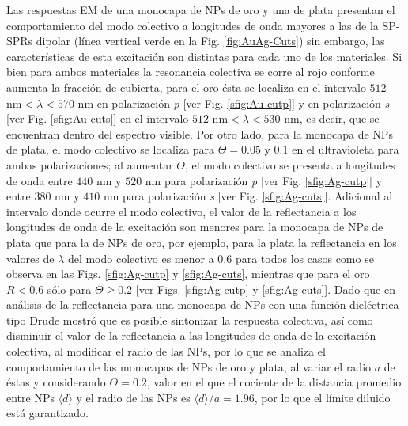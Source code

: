 Las respuestas EM de una monocapa de NPs  de oro y una de plata presentan el comportamiento del modo colectivo a longitudes de onda mayores a las de la SP-SPRs dipolar (línea vertical verde en la Fig. \ref{fig:AuAg-Cuts}) sin embargo, las características de esta excitación son distintas para cada uno de los materiales. Si bien para ambos materiales la resonancia colectiva se corre al rojo conforme aumenta la fracción de cubierta, para el oro ésta se localiza en el intervalo $512$ nm$<\lambda<570$ nm en polarización \emph{p} [ver Fig. \ref{sfig:Au-cutp}] y  en polarización \emph{s} [ver Fig. \ref{sfig:Au-cuts}] en el intervalo  $512$ nm$<\lambda<530$ nm, es decir, que se encuentran dentro del espectro visible. Por otro lado, para la monocapa de NPs de plata, el modo colectivo se localiza para $\Theta = 0.05$ y $0.1$ en el ultravioleta para ambas polarizaciones; al aumentar $\Theta$, el modo colectivo se presenta a longitudes de onda entre $440$ nm y $520$ nm para polarización \emph{p} [ver Fig. \ref{sfig:Ag-cutp}] y entre $380$ nm y $410$ nm para polarización \emph{s} [ver Fig. \ref{sfig:Ag-cuts}]. Adicional al intervalo donde ocurre el modo colectivo, el valor de la reflectancia a los longitudes de onda de la excitación son menores para la monocapa de NPs de plata que para la de NPs de oro, por ejemplo, para la plata la reflectancia en los valores de $\lambda$ del modo colectivo es menor a $0.6$ para todos los casos como se observa en las Figs. \ref{sfig:Ag-cutp} y \ref{sfig:Ag-cuts}, mientras que para el oro $R<0.6$ sólo para $\Theta\geq 0.2$ [ver Figs. \ref{sfig:Ag-cutp} y \ref{sfig:Ag-cuts}]. Dado que en análisis de la reflectancia para una monocapa de NPs con una función dieléctrica tipo Drude mostró que es posible sintonizar la respuesta colectiva, así como disminuir el valor de la reflectancia a las longitudes de onda de la excitación colectiva, al modificar el radio de las NPs, por lo que se analiza el comportamiento de las monocapas de NPs de oro y plata, al variar el radio $a$ de éstas y considerando $\Theta = 0.2$, valor en el que el cociente de la distancia promedio entre NPs $\langle d \rangle$ y el radio de las NPs es $\langle d \rangle / a = 1.96 $, por lo que el límite diluido está garantizado.

